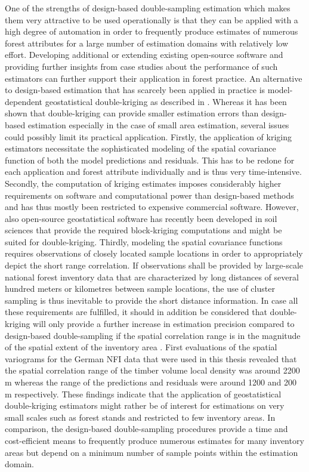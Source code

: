 One of the strengths of design-based double-sampling estimation which makes them very attractive to be used operationally is that they can be applied with a high degree of automation in order to frequently produce estimates of numerous forest attributes for a large number of estimation domains with relatively low effort. Developing additional or extending existing open-source software and providing further insights from case studies about the performance of such estimators can further support their application in forest practice. An alternative to design-based estimation that has scarcely been applied in practice is model-dependent geostatistical double-kriging as described in \citet{mandallaz1993}. Whereas it has been shown that double-kriging can provide smaller estimation errors than design-based estimation especially in the case of small area estimation, several issues could possibly limit its practical application. Firstly, the application of kriging estimators necessitate the sophisticated modeling of the spatial covariance function of both the model predictions and residuals. This has to be redone for each application and forest attribute individually and is thus very time-intensive. Secondly, the computation of kriging estimates imposes considerably higher requirements on software and computational power than design-based methods and has thus mostly been restricted to expensive commercial software. However, also open-source geostatistical software has recently been developed in soil sciences \citep{georob2018} that provide the required block-kriging computations and might be suited for double-kriging. Thirdly, modeling the spatial covariance functions requires observations of closely located sample locations in order to appropriately depict the short range correlation. If observations shall be provided by large-scale national forest inventory data that are characterized by long distances of several hundred meters or kilometres between sample locations, the use of cluster sampling is thus inevitable to provide the short distance information. In case all these requirements are fulfilled, it should in addition be considered that double-kriging will only provide a further increase in estimation precision compared to design-based double-sampling if the spatial correlation range is in the magnitude of the spatial extent of the inventory area \citep{mandallaz1993}. First evaluations of the spatial variograms for the German NFI data that were used in this thesis revealed that the spatial correlation range of the timber volume local density was around 2200 m whereas the range of the predictions and residuals were around 1200 and 200 m respectively. These findings indicate that the application of geostatistical double-kriging estimators might rather be of interest for estimations on very small scales such as forest stands and restricted to few inventory areas. In comparison, the design-based double-sampling procedures provide a time and cost-efficient means to frequently produce numerous estimates for many inventory areas but depend on a minimum number of sample points within the estimation domain.




